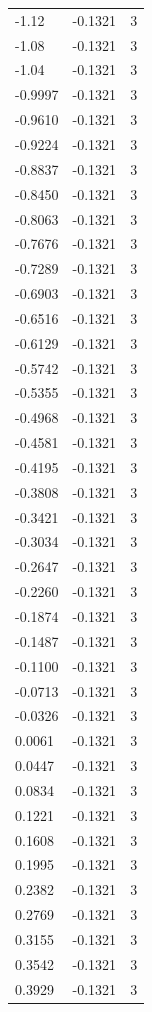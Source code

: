 \begin{longtable}{lrr}
  -1.12 & -0.1321 & 3 \\
  -1.08 & -0.1321 & 3 \\
  -1.04 & -0.1321 & 3 \\
  -0.9997 & -0.1321 & 3 \\
  -0.9610 & -0.1321 & 3 \\
  -0.9224 & -0.1321 & 3 \\
  -0.8837 & -0.1321 & 3 \\
  -0.8450 & -0.1321 & 3 \\
  -0.8063 & -0.1321 & 3 \\
  -0.7676 & -0.1321 & 3 \\
  -0.7289 & -0.1321 & 3 \\
  -0.6903 & -0.1321 & 3 \\
  -0.6516 & -0.1321 & 3 \\
  -0.6129 & -0.1321 & 3 \\
  -0.5742 & -0.1321 & 3 \\
  -0.5355 & -0.1321 & 3 \\
  -0.4968 & -0.1321 & 3 \\
  -0.4581 & -0.1321 & 3 \\
  -0.4195 & -0.1321 & 3 \\
  -0.3808 & -0.1321 & 3 \\
  -0.3421 & -0.1321 & 3 \\
  -0.3034 & -0.1321 & 3 \\
  -0.2647 & -0.1321 & 3 \\
  -0.2260 & -0.1321 & 3 \\
  -0.1874 & -0.1321 & 3 \\
  -0.1487 & -0.1321 & 3 \\
  -0.1100 & -0.1321 & 3 \\
  -0.0713 & -0.1321 & 3 \\
  -0.0326 & -0.1321 & 3 \\
  0.0061 & -0.1321 & 3 \\
  0.0447 & -0.1321 & 3 \\
  0.0834 & -0.1321 & 3 \\
  0.1221 & -0.1321 & 3 \\
  0.1608 & -0.1321 & 3 \\
  0.1995 & -0.1321 & 3 \\
  0.2382 & -0.1321 & 3 \\
  0.2769 & -0.1321 & 3 \\
  0.3155 & -0.1321 & 3 \\
  0.3542 & -0.1321 & 3 \\
  0.3929 & -0.1321 & 3 \\

\end{longtable}
